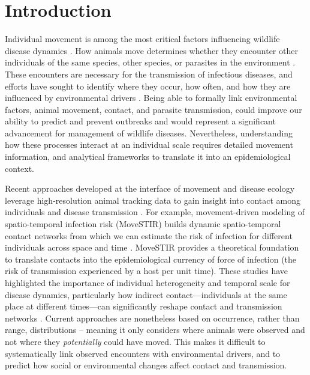 \documentclass[letterpaper]{article}
\begin{document}
\section*{Introduction}

Individual movement is among the most critical factors influencing wildlife disease dynamics \citep{Dougherty2018,Manlove2022}. 
How animals move determines whether they encounter other individuals of the same species, other species, or parasites in the environment \citep{Martinez-Garcia2020,Das2023}. 
These encounters are necessary for the transmission of infectious diseases, and efforts have sought to identify where they occur, how often, and how they are influenced by environmental drivers \citep{Titcomb2021,Dougherty2022}. 
Being able to formally link environmental factors, animal movement, contact, and parasite transmission, could improve our ability to predict and prevent outbreaks and would represent a significant advancement for management of wildlife diseases.  
Nevertheless, understanding how these processes interact at an individual scale requires detailed movement information, and analytical frameworks to translate it into an epidemiological context.

Recent approaches developed at the interface of movement and disease ecology leverage high-resolution animal tracking data to gain insight into contact among individuals and disease transmission \citep{Richardson2015,Wilber2022,Yang2023}. For example, movement-driven modeling of spatio-temporal infection risk (MoveSTIR) builds dynamic spatio-temporal contact networks from which we can estimate the risk of infection for different individuals across space and time \citep{Wilber2022}. MoveSTIR provides a theoretical foundation to translate contacts into the epidemiological currency of force of infection (the risk of transmission experienced by a host per unit time). These studies have highlighted the importance of individual heterogeneity and temporal scale for disease dynamics, particularly how indirect contact---individuals at the same place at different times---can significantly reshape contact and transmission networks \citep{Richardson2015,Yang2023}. Current approaches are nonetheless based on occurrence, rather than range, distributions \citep[in the terminology of ][]{Alston2022} -- meaning it only considers where animals were observed and not where they \emph{potentially} could have moved. This makes it difficult to systematically link observed encounters with environmental drivers, and to predict how social or environmental changes affect contact and transmission. 
\end{document}
